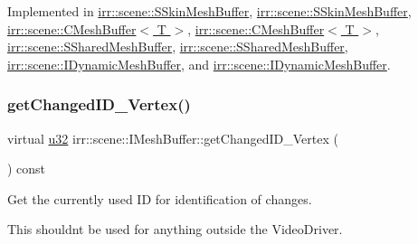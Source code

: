 Implemented in \hyperlink{structirr_1_1scene_1_1SSkinMeshBuffer_a94faa430425d73fbb6cab74ac65af1c1}{irr\+::scene\+::\+S\+Skin\+Mesh\+Buffer}, \hyperlink{structirr_1_1scene_1_1SSkinMeshBuffer_a94faa430425d73fbb6cab74ac65af1c1}{irr\+::scene\+::\+S\+Skin\+Mesh\+Buffer}, \hyperlink{classirr_1_1scene_1_1CMeshBuffer_a99abc7d5f5a9f34221c58a598b33ce3a}{irr\+::scene\+::\+C\+Mesh\+Buffer$<$ T $>$}, \hyperlink{classirr_1_1scene_1_1CMeshBuffer_a99abc7d5f5a9f34221c58a598b33ce3a}{irr\+::scene\+::\+C\+Mesh\+Buffer$<$ T $>$}, \hyperlink{structirr_1_1scene_1_1SSharedMeshBuffer_ad9c7307fcad8c9b8db3db98f95863196}{irr\+::scene\+::\+S\+Shared\+Mesh\+Buffer}, \hyperlink{structirr_1_1scene_1_1SSharedMeshBuffer_ad9c7307fcad8c9b8db3db98f95863196}{irr\+::scene\+::\+S\+Shared\+Mesh\+Buffer}, \hyperlink{classirr_1_1scene_1_1IDynamicMeshBuffer_a3480aae22a6701453a19b4c4cbcf2555}{irr\+::scene\+::\+I\+Dynamic\+Mesh\+Buffer}, and \hyperlink{classirr_1_1scene_1_1IDynamicMeshBuffer_a3480aae22a6701453a19b4c4cbcf2555}{irr\+::scene\+::\+I\+Dynamic\+Mesh\+Buffer}.

\mbox{\label{classirr_1_1scene_1_1IMeshBuffer_aba48df31edf92a0117692c0be02298db}} 
\subsubsection{\texorpdfstring{get\+Changed\+I\+D\+\_\+\+Vertex()}{getChangedID\_Vertex()}\hspace{0.1cm}{\footnotesize\ttfamily [2/2]}}
{\footnotesize\ttfamily virtual \hyperlink{namespaceirr_a0416a53257075833e7002efd0a18e804}{u32} irr\+::scene\+::\+I\+Mesh\+Buffer\+::get\+Changed\+I\+D\+\_\+\+Vertex (\begin{DoxyParamCaption}{ }\end{DoxyParamCaption}) const\hspace{0.3cm}{\ttfamily [pure virtual]}}



Get the currently used ID for identification of changes. 

This shouldn\textquotesingle{}t be used for anything outside the Video\+Driver. 

